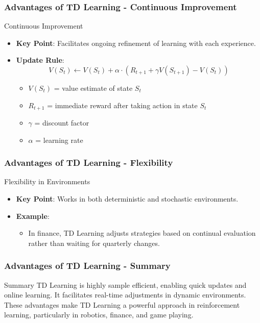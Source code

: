 \documentclass[aspectratio=169]{beamer}
\begin{document}
\begin{frame}[fragile]
    \frametitle{Advantages of TD Learning - Continuous Improvement}
    \begin{block}{Continuous Improvement}
        \begin{itemize}
            \item \textbf{Key Point}: Facilitates ongoing refinement of learning with each experience.
            \item \textbf{Update Rule}:
            \begin{equation}
                V(S_t) \leftarrow V(S_t) + \alpha \cdot \left( R_{t+1} + \gamma V(S_{t+1}) - V(S_t) \right)
            \end{equation}
            \begin{itemize}
                \item \( V(S_t) \) = value estimate of state \( S_t \)
                \item \( R_{t+1} \) = immediate reward after taking action in state \( S_t \)
                \item \( \gamma \) = discount factor
                \item \( \alpha \) = learning rate
            \end{itemize}
        \end{itemize}
    \end{block}
\end{frame}

\begin{frame}[fragile]
    \frametitle{Advantages of TD Learning - Flexibility}
    \begin{block}{Flexibility in Environments}
        \begin{itemize}
            \item \textbf{Key Point}: Works in both deterministic and stochastic environments.
            \item \textbf{Example}:
                \begin{itemize}
                    \item In finance, TD Learning adjusts strategies based on continual evaluation rather than waiting for quarterly changes.
                \end{itemize}
        \end{itemize}
    \end{block}
\end{frame}

\begin{frame}[fragile]
    \frametitle{Advantages of TD Learning - Summary}
    \begin{block}{Summary}
        TD Learning is highly sample efficient, enabling quick updates and online learning. It facilitates real-time adjustments in dynamic environments. These advantages make TD Learning a powerful approach in reinforcement learning, particularly in robotics, finance, and game playing.
    \end{block}
\end{frame}
\end{document}
